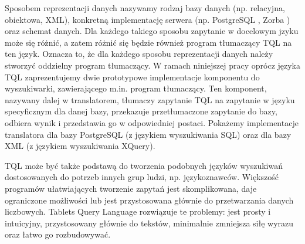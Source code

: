 Sposobem reprezentacji danych nazywamy rodzaj bazy danych (np. relacyjna, obiektowa, XML), konkretną implementację serwera 
(np. PostgreSQL \cite{postgres}, Zorba \cite{zorba}) oraz schemat danych. Dla każdego takiego sposobu zapytanie w docelowym jzyku może się różnić, a zatem 
różnić się będzie również program tłumaczący TQL na ten język.
Oznacza to, że dla każdego sposobu reprezentacji danych należy stworzyć oddzielny program tłumaczący. 
W ramach niniejszej pracy oprócz języka TQL zaprezentujemy dwie prototypowe implementacje komponentu do wyszukiwarki, zawierającego 
m.in. program tłumaczący.
Ten komponent, nazywany dalej w translatorem, tłumaczy zapytanie TQL na zapytanie w języku specyficznym dla danej bazy, przekazuje 
przetłumaczone zapytanie do bazy, odbiera wynik i przedstawia go w odpowiedniej postaci. Pokażemy implementacje translatora dla bazy 
PostgreSQL (z językiem wyszukiwania SQL) oraz dla bazy XML (z językiem wyszukiwania XQuery).





TQL może być także podstawą do tworzenia podobnych języków wyszukiwań dostosowanych do potrzeb innych grup ludzi, np. językoznawców.
Większość programów ułatwiających tworzenie zapytań jest skomplikowana, daje ograniczone możliwości lub jest przystosowana głównie do 
przetwarzania danych liczbowych. Tablets Query Language rozwiązuje te problemy: jest prosty i intuicyjny, przystosowany głównie do tekstów,
 minimalnie zmniejsza siłę wyrazu oraz łatwo go rozbudowywać. 




